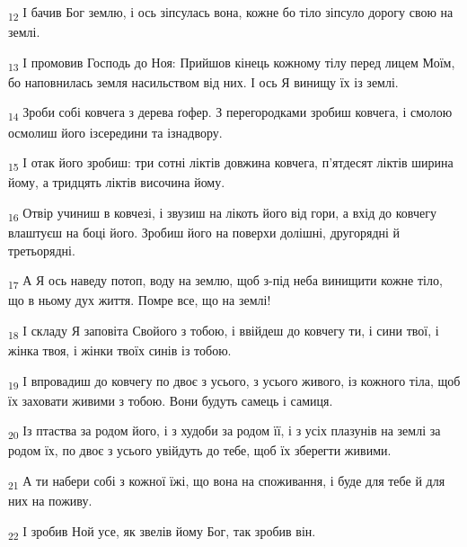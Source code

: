 \begin{tcolorbox}
\textsubscript{12} І бачив Бог землю, і ось зіпсулась вона, кожне бо тіло зіпсуло дорогу свою на землі.
\end{tcolorbox}
\begin{tcolorbox}
\textsubscript{13} І промовив Господь до Ноя: Прийшов кінець кожному тілу перед лицем Моїм, бо наповнилась земля насильством від них. І ось Я винищу їх із землі.
\end{tcolorbox}
\begin{tcolorbox}
\textsubscript{14} Зроби собі ковчега з дерева ґофер. З перегородками зробиш ковчега, і смолою осмолиш його ізсередини та ізнадвору.
\end{tcolorbox}
\begin{tcolorbox}
\textsubscript{15} І отак його зробиш: три сотні ліктів довжина ковчега, п'ятдесят ліктів ширина йому, а тридцять ліктів височина йому.
\end{tcolorbox}
\begin{tcolorbox}
\textsubscript{16} Отвір учиниш в ковчезі, і звузиш на лікоть його від гори, а вхід до ковчегу влаштуєш на боці його. Зробиш його на поверхи долішні, другорядні й третьорядні.
\end{tcolorbox}
\begin{tcolorbox}
\textsubscript{17} А Я ось наведу потоп, воду на землю, щоб з-під неба винищити кожне тіло, що в ньому дух життя. Помре все, що на землі!
\end{tcolorbox}
\begin{tcolorbox}
\textsubscript{18} І складу Я заповіта Свойого з тобою, і ввійдеш до ковчегу ти, і сини твої, і жінка твоя, і жінки твоїх синів із тобою.
\end{tcolorbox}
\begin{tcolorbox}
\textsubscript{19} І впровадиш до ковчегу по двоє з усього, з усього живого, із кожного тіла, щоб їх заховати живими з тобою. Вони будуть самець і самиця.
\end{tcolorbox}
\begin{tcolorbox}
\textsubscript{20} Із птаства за родом його, і з худоби за родом її, і з усіх плазунів на землі за родом їх, по двоє з усього увійдуть до тебе, щоб їх зберегти живими.
\end{tcolorbox}
\begin{tcolorbox}
\textsubscript{21} А ти набери собі з кожної їжі, що вона на споживання, і буде для тебе й для них на поживу.
\end{tcolorbox}
\begin{tcolorbox}
\textsubscript{22} І зробив Ной усе, як звелів йому Бог, так зробив він.
\end{tcolorbox}
